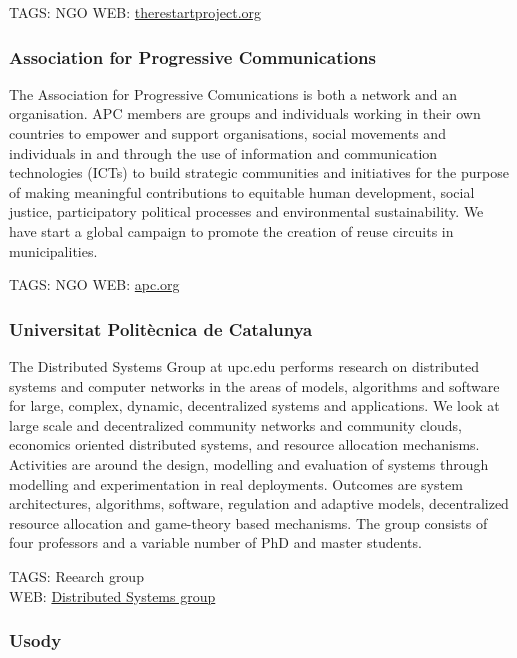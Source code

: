 \documentclass[
]{book}
\begin{document}
TAGS: NGO
WEB: \href{http://www.therestartproject.org}{therestartproject.org}

\hypertarget{association-for-progressive-communications}{%
\subsubsection{Association for Progressive Communications}\label{association-for-progressive-communications}}

The Association for Progressive Comunications is both a network and an organisation. APC members are groups and individuals working in their own countries to empower and support organisations, social movements and individuals in and through the use of information and communication technologies (ICTs) to build strategic communities and initiatives for the purpose of making meaningful contributions to equitable human development, social justice, participatory political processes and environmental sustainability. We have start a global campaign to promote the creation of reuse circuits in municipalities.

TAGS: NGO
WEB: \href{http://apc.org}{apc.org}

\hypertarget{universitat-polituxe8cnica-de-catalunya}{%
\subsubsection{Universitat Politècnica de Catalunya}\label{universitat-polituxe8cnica-de-catalunya}}

The Distributed Systems Group at upc.edu performs research on distributed systems and computer networks in the areas of models, algorithms and software for large, complex, dynamic, decentralized systems and applications. We look at large scale and decentralized community networks and community clouds, economics oriented distributed systems, and resource allocation mechanisms. Activities are around the design, modelling and evaluation of systems through modelling and experimentation in real deployments. Outcomes are system architectures, algorithms, software, regulation and adaptive models, decentralized resource allocation and game-theory based mechanisms. The group consists of four professors and a variable number of PhD and master students.

TAGS: Reearch group\\
WEB: \href{https://dsg.ac.upc.edu/}{Distributed Systems group}

\hypertarget{usody}{%
\subsubsection{Usody}\label{usody}}
\end{document}
